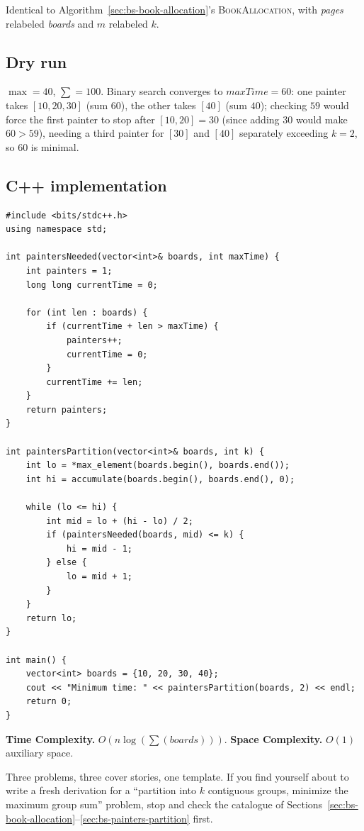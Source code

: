 Identical to Algorithm~\ref{sec:bs-book-allocation}'s
\textsc{BookAllocation}, with \textit{pages} relabeled \textit{boards} and
$m$ relabeled $k$.

\subsection*{Dry run}


$\max=40$, $\sum=100$. Binary search converges to $\textit{maxTime}=60$:
one painter takes $[10,20,30]$ (sum $60$), the other takes $[40]$ (sum
$40$); checking $59$ would force the first painter to stop after
$[10,20]=30$ (since adding $30$ would make $60>59$), needing a third
painter for $[30]$ and $[40]$ separately exceeding $k=2$, so $60$ is
minimal.

\subsection*{C++ implementation}

\begin{lstlisting}
#include <bits/stdc++.h>
using namespace std;

int paintersNeeded(vector<int>& boards, int maxTime) {
    int painters = 1;
    long long currentTime = 0;

    for (int len : boards) {
        if (currentTime + len > maxTime) {
            painters++;
            currentTime = 0;
        }
        currentTime += len;
    }
    return painters;
}

int paintersPartition(vector<int>& boards, int k) {
    int lo = *max_element(boards.begin(), boards.end());
    int hi = accumulate(boards.begin(), boards.end(), 0);

    while (lo <= hi) {
        int mid = lo + (hi - lo) / 2;
        if (paintersNeeded(boards, mid) <= k) {
            hi = mid - 1;
        } else {
            lo = mid + 1;
        }
    }
    return lo;
}

int main() {
    vector<int> boards = {10, 20, 30, 40};
    cout << "Minimum time: " << paintersPartition(boards, 2) << endl;
    return 0;
}
\end{lstlisting}

\begin{complexitybox}
\textbf{Time Complexity.}
$O(n \log(\sum(\textit{boards})))$.
\textbf{Space Complexity.} $O(1)$ auxiliary space.
\end{complexitybox}

\begin{takeawaybox}
Three problems, three cover stories, one template. If you find yourself
about to write a fresh derivation for a ``partition into $k$ contiguous
groups, minimize the maximum group sum'' problem, stop and check the
catalogue of Sections~\ref{sec:bs-book-allocation}--\ref{sec:bs-painters-partition}
first.
\end{takeawaybox}
